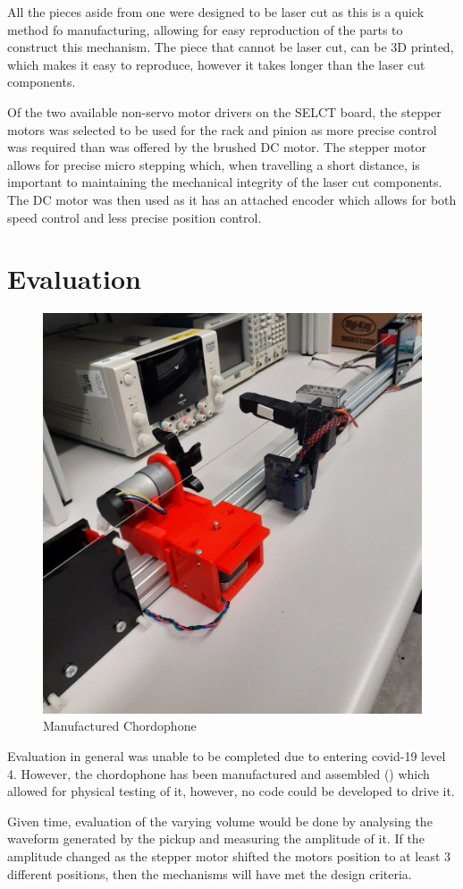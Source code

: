 \documentclass[12pt, a4paper, onecolumn]{IEEEtran}
\begin{document}
		All the pieces aside from one were designed to be laser cut as this is a quick method fo manufacturing, allowing for easy reproduction of the parts to construct this mechanism.
		The piece that cannot be laser cut, can be 3D printed, which makes it easy to reproduce, however it takes longer than the laser cut components.

		Of the two available non-servo motor drivers on the SELCT board, the stepper motors was selected to be used for the rack and pinion as more precise control was required than was offered by the brushed DC motor.
		The stepper motor allows for precise micro stepping which, when travelling a short distance, is important to maintaining the mechanical integrity of the laser cut components.
		The DC motor was then used as it has an attached encoder which allows for both speed control and less precise position control.


	\section{Evaluation}
		\begin{figure}[!h]
			\centering
			\includegraphics[width=0.6\columnwidth]{finished_chordophone.jpg}
			\caption{Manufactured Chordophone}
			\label{fig:finished}
		\end{figure}
		Evaluation in general was unable to be completed due to entering covid-19 level 4.
		However, the chordophone has been manufactured and assembled () which allowed for physical testing of it, however, no code could be developed to drive it.

		Given time, evaluation of the varying volume would be done by analysing the waveform generated by the pickup and measuring the amplitude of it.
		If the amplitude changed as the stepper motor shifted the motors position to at least 3 different positions, then the mechanisms will have met the design criteria.
\end{document}
